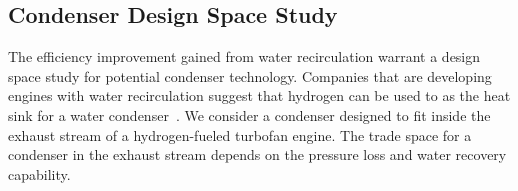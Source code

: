 \documentclass[conf]{new-aiaa}
\begin{document}
\subsection{Condenser Design Space Study}
\label{sub:dpqp_sweep}
The efficiency improvement gained from water recirculation warrant a design space study for potential condenser technology.
Companies that are developing engines with water recirculation suggest that hydrogen can be used to as the heat sink for a water condenser~\cite{arpa-e_2021}.
We consider a condenser designed to fit inside the exhaust stream of a hydrogen-fueled turbofan engine.
The trade space for a condenser in the exhaust stream depends on the pressure loss and water recovery capability.
\end{document}
